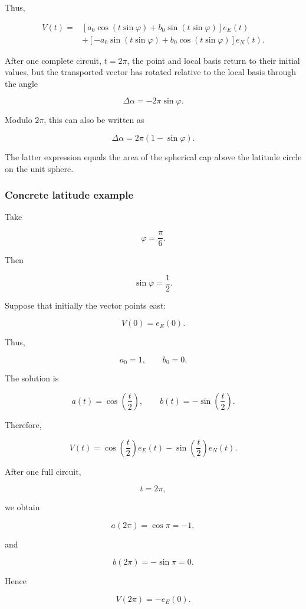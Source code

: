 \documentclass[12pt,a4paper]{article}
\theoremstyle{notespace}
\begin{document}
Thus,

\[
\boxed{
	\begin{aligned}
		V(t)
		={}&
		\left[
		a_0\cos(t\sin\varphi)
		+
		b_0\sin(t\sin\varphi)
		\right]e_E(t)
		\\
		&+
		\left[
		-a_0\sin(t\sin\varphi)
		+
		b_0\cos(t\sin\varphi)
		\right]e_N(t).
	\end{aligned}
}
\]

After one complete circuit, \(t=2\pi\), the point and local basis return
to their initial values, but the transported vector has rotated relative
to the local basis through the angle

\[
\boxed{
	\Delta\alpha=-2\pi\sin\varphi.
}
\]

Modulo \(2\pi\), this can also be written as

\[
\boxed{
	\Delta\alpha
	=
	2\pi(1-\sin\varphi).
}
\]

The latter expression equals the area of the spherical cap above the
latitude circle on the unit sphere.

\subsubsection{Concrete latitude example}

Take

\[
\varphi=\frac{\pi}{6}.
\]

Then

\[
\sin\varphi=\frac12.
\]

Suppose that initially the vector points east:

\[
V(0)=e_E(0).
\]

Thus,

\[
a_0=1,
\qquad
b_0=0.
\]

The solution is

\[
a(t)=\cos\left(\frac{t}{2}\right),
\qquad
b(t)=-\sin\left(\frac{t}{2}\right).
\]

Therefore,

\[
V(t)
=
\cos\left(\frac{t}{2}\right)e_E(t)
-
\sin\left(\frac{t}{2}\right)e_N(t).
\]

After one full circuit,

\[
t=2\pi,
\]

we obtain

\[
a(2\pi)=\cos\pi=-1,
\]

and

\[
b(2\pi)=-\sin\pi=0.
\]

Hence

\[
\boxed{
	V(2\pi)=-e_E(0).
}
\]
\end{document}
